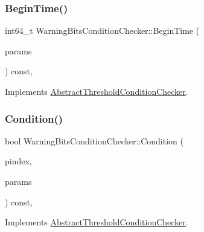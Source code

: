 \subsubsection{\texorpdfstring{Begin\+Time()}{BeginTime()}}
{\footnotesize\ttfamily int64\+\_\+t Warning\+Bits\+Condition\+Checker\+::\+Begin\+Time (\begin{DoxyParamCaption}\item[{const \mbox{\hyperlink{chainparams_8h_a5e1ca1b35c3dd1a4e20f18445f28dd9c}{Consensus\+::\+Params}} \&}]{params }\end{DoxyParamCaption}) const\hspace{0.3cm}{\ttfamily [inline]}, {\ttfamily [virtual]}}



Implements \mbox{\hyperlink{class_abstract_threshold_condition_checker_abd1169fade7a2934d605bc4fa53878c6}{Abstract\+Threshold\+Condition\+Checker}}.

\mbox{\label{class_warning_bits_condition_checker_aae2fc419d193b147e8fad8121fb5e579}} 
\subsubsection{\texorpdfstring{Condition()}{Condition()}}
{\footnotesize\ttfamily bool Warning\+Bits\+Condition\+Checker\+::\+Condition (\begin{DoxyParamCaption}\item[{const \mbox{\hyperlink{class_c_block_index}{C\+Block\+Index}} $\ast$}]{pindex,  }\item[{const \mbox{\hyperlink{chainparams_8h_a5e1ca1b35c3dd1a4e20f18445f28dd9c}{Consensus\+::\+Params}} \&}]{params }\end{DoxyParamCaption}) const\hspace{0.3cm}{\ttfamily [inline]}, {\ttfamily [virtual]}}



Implements \mbox{\hyperlink{class_abstract_threshold_condition_checker_a242388d3046f69956904f0ea7a1e92ee}{Abstract\+Threshold\+Condition\+Checker}}.

\mbox{\label{class_warning_bits_condition_checker_ace6c66438992ea0f798806f39eca83a7}} 
